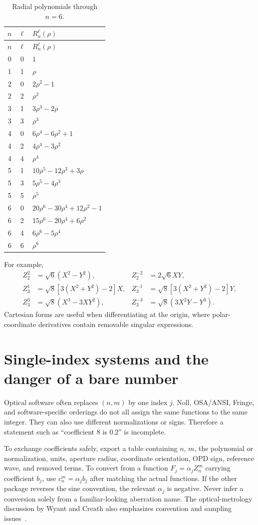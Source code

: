 \begin{longtable}{@{}ccl@{}}
\caption{Radial polynomials through $n=6$.}\label{zc:radialtable}\\
\toprule
$n$&$\ell$&$R_n^\ell(\rho)$\\\midrule\endfirsthead
\toprule $n$&$\ell$&$R_n^\ell(\rho)$\\\midrule\endhead
0&0&$1$\\
1&1&$\rho$\\
2&0&$2\rho^2-1$\\
2&2&$\rho^2$\\
3&1&$3\rho^3-2\rho$\\
3&3&$\rho^3$\\
4&0&$6\rho^4-6\rho^2+1$\\
4&2&$4\rho^4-3\rho^2$\\
4&4&$\rho^4$\\
5&1&$10\rho^5-12\rho^3+3\rho$\\
5&3&$5\rho^5-4\rho^3$\\
5&5&$\rho^5$\\
6&0&$20\rho^6-30\rho^4+12\rho^2-1$\\
6&2&$15\rho^6-20\rho^4+6\rho^2$\\
6&4&$6\rho^6-5\rho^4$\\
6&6&$\rho^6$\\\bottomrule
\end{longtable}

For example,
\begin{align}
 Z_2^2&=\sqrt6(X^2-Y^2),&
 Z_2^{-2}&=2\sqrt6XY,\\
 Z_3^1&=\sqrt8[3(X^2+Y^2)-2]X,&
 Z_3^{-1}&=\sqrt8[3(X^2+Y^2)-2]Y,\\
 Z_3^3&=\sqrt8(X^3-3XY^2),&
 Z_3^{-3}&=\sqrt8(3X^2Y-Y^3).
\end{align}
Cartesian forms are useful when differentiating at the origin, where
polar-coordinate derivatives contain removable singular expressions.

\section{Single-index systems and the danger of a bare number}
Optical software often replaces $(n,m)$ by one index $j$. Noll,
OSA/ANSI, Fringe, and software-specific orderings do not all assign the
same functions to the same integer. They can also use different
normalizations or signs. Therefore a statement such as ``coefficient 8
is $0.2$'' is incomplete.

To exchange coefficients safely, export a table containing $n$, $m$,
the polynomial or normalization, units, aperture radius, coordinate
orientation, OPD sign, reference wave, and removed terms. To convert
from a function $F_j=\alpha_j Z_n^m$ carrying coefficient $b_j$, use
$c_n^m=\alpha_jb_j$ after matching the actual functions. If the other
package reverses the sine convention, the relevant $\alpha_j$ is
negative. Never infer a conversion solely from a familiar-looking
aberration name. The optical-metrology discussion by Wyant and Creath
also emphasizes convention and sampling issues~\cite{zc:wyant}.

